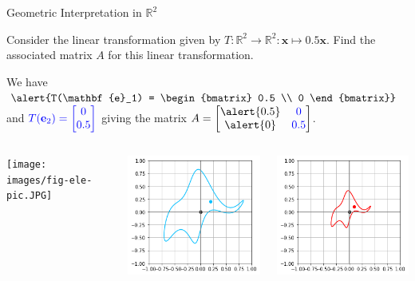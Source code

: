 \documentclass[xcolor=dvipsnames,aspectratio=169,t]{beamer}
\begin{document}
\begin{frame}{Geometric Interpretation in $\mathbb{R}^2$}

Consider the linear transformation given by $T: \mathbb{R}^2 \to \mathbb{R}^2: \mathbf{x} \mapsto 0.5 \mathbf{x}$. Find the associated matrix $A$ for this linear transformation. \bs

We have  $\dsty \alert{T(\mathbf{e}_1) = \begin{bmatrix} 0.5 \\ 0 \end{bmatrix}}$ and $\displaystyle \textcolor{blue}{T(\mathbf{e}_2) = \begin{bmatrix} 0 \\ 0.5 \end{bmatrix}}$ giving the matrix $\dsty A = \begin{bmatrix} \alert{0.5} & \colorb{0} \\ \alert{0} & \colorb{0.5} \end{bmatrix}$.

\begin{columns}

\column{0.33\tw}

\begin{center}
\texttt{[image: images/fig-ele-pic.JPG]}
\end{center}

\column{0.33\tw}

\begin{center}
\includegraphics[width=0.8\tw]{images/fig-elephant.png}
\end{center}

\column{0.33\tw}

\begin{center}
\includegraphics[width=0.8\tw]{images/fig-ele-dilate.png}
\end{center}

\end{columns}

\end{frame}
\end{document}
